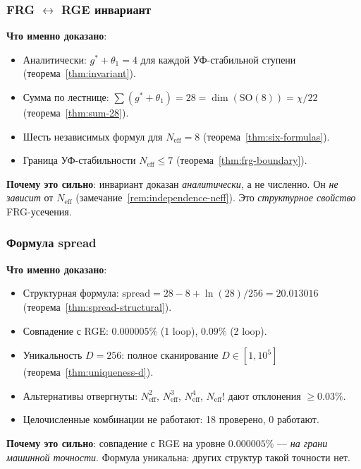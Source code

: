 \documentclass[11pt,a4paper]{article}
\newcommand{\SO}{\ensuremath{\mathrm{SO}}}
\theoremstyle{definition}
\begin{document}
\subsubsection{FRG \texorpdfstring{$\leftrightarrow$}{} RGE инвариант}

\textbf{Что именно доказано}:
\begin{itemize}
    \item Аналитически: $g^* + \theta_1 = 4$ для каждой
          УФ-стабильной ступени (теорема~\ref{thm:invariant}).
    \item Сумма по лестнице:
          $\sum(g^* + \theta_1) = 28 = \dim(\SO(8)) = \chi/22$
          (теорема~\ref{thm:sum-28}).
    \item Шесть независимых формул для $N_{\text{eff}} = 8$
          (теорема~\ref{thm:six-formulas}).
    \item Граница УФ-стабильности $N_{\text{eff}} \le 7$
          (теорема~\ref{thm:frg-boundary}).
\end{itemize}

\medskip\noindent
\textbf{Почему это сильно}: инвариант доказан
\emph{аналитически}, а не численно. Он \emph{не зависит}
от $N_{\text{eff}}$ (замечание~\ref{rem:independence-neff}).
Это \emph{структурное свойство} FRG-усечения.

\subsubsection{Формула spread}

\textbf{Что именно доказано}:
\begin{itemize}
    \item Структурная формула:
          $\text{spread} = 28 - 8 + \ln(28)/256 = 20.013016$
          (теорема~\ref{thm:spread-structural}).
    \item Совпадение с RGE: $0.000005\%$ (1 loop),
          $0.09\%$ (2 loop).
    \item Уникальность $D = 256$: полное сканирование
          $D \in [1, 10^5]$ (теорема~\ref{thm:uniqueness-d}).
    \item Альтернативы отвергнуты: $N_{\text{eff}}^2$,
          $N_{\text{eff}}^3$, $N_{\text{eff}}^4$,
          $N_{\text{eff}}!$ дают отклонения $\geq 0.03\%$.
    \item Целочисленные комбинации не работают:
          18 проверено, 0 работают.
\end{itemize}

\medskip\noindent
\textbf{Почему это сильно}: совпадение с RGE на уровне
$0.000005\%$ --- \emph{на грани машинной точности}.
Формула уникальна: других структур такой точности нет.
\end{document}

